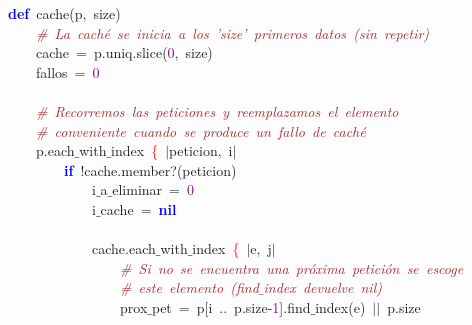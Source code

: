 \noindent
\mbox{}\textbf{\textcolor{Blue}{def}}\ cache\textcolor{BrickRed}{(}p\textcolor{BrickRed}{,}\ size\textcolor{BrickRed}{)} \\
\mbox{}\ \ \ \ \textit{\textcolor{Brown}{\#\ La\ caché\ se\ inicia\ a\ los\ 'size'\ primeros\ datos\ (sin\ repetir)}} \\
\mbox{}\ \ \ \ cache\ \textcolor{BrickRed}{=}\ p\textcolor{BrickRed}{.}uniq\textcolor{BrickRed}{.}slice\textcolor{BrickRed}{(}\textcolor{Purple}{0}\textcolor{BrickRed}{,}\ size\textcolor{BrickRed}{)} \\
\mbox{}\ \ \ \ fallos\ \textcolor{BrickRed}{=}\ \textcolor{Purple}{0} \\
\mbox{} \\
\mbox{}\ \ \ \ \textit{\textcolor{Brown}{\#\ Recorremos\ las\ peticiones\ y\ reemplazamos\ el\ elemento}} \\
\mbox{}\ \ \ \ \textit{\textcolor{Brown}{\#\ conveniente\ cuando\ se\ produce\ un\ fallo\ de\ caché}} \\
\mbox{}\ \ \ \ p\textcolor{BrickRed}{.}each$\_$with$\_$index\ \textcolor{Red}{\{}\ \textcolor{BrickRed}{$|$}peticion\textcolor{BrickRed}{,}\ i\textcolor{BrickRed}{$|$}\  \\
\mbox{}\ \ \ \ \ \ \ \ \textbf{\textcolor{Blue}{if}}\ \textcolor{BrickRed}{!}cache\textcolor{BrickRed}{.}member?\textcolor{BrickRed}{(}peticion\textcolor{BrickRed}{)} \\
\mbox{}\ \ \ \ \ \ \ \ \ \ \ \ i$\_$a$\_$eliminar\ \textcolor{BrickRed}{=}\ \textcolor{Purple}{0} \\
\mbox{}\ \ \ \ \ \ \ \ \ \ \ \ i$\_$cache\ \textcolor{BrickRed}{=}\ \textbf{\textcolor{Blue}{nil}} \\
\mbox{} \\
\mbox{}\ \ \ \ \ \ \ \ \ \ \ \ cache\textcolor{BrickRed}{.}each$\_$with$\_$index\ \textcolor{Red}{\{}\ \textcolor{BrickRed}{$|$}e\textcolor{BrickRed}{,}\ j\textcolor{BrickRed}{$|$} \\
\mbox{}\ \ \ \ \ \ \ \ \ \ \ \ \ \ \ \ \textit{\textcolor{Brown}{\#\ Si\ no\ se\ encuentra\ una\ próxima\ petición\ se\ escoge}} \\
\mbox{}\ \ \ \ \ \ \ \ \ \ \ \ \ \ \ \ \textit{\textcolor{Brown}{\#\ este\ elemento\ (find$\_$index\ devuelve\ nil)}} \\
\mbox{}\ \ \ \ \ \ \ \ \ \ \ \ \ \ \ \ prox$\_$pet\ \textcolor{BrickRed}{=}\ p\textcolor{BrickRed}{[}i\ \textcolor{BrickRed}{..}\ p\textcolor{BrickRed}{.}size\textcolor{BrickRed}{-}\textcolor{Purple}{1}\textcolor{BrickRed}{].}find$\_$index\textcolor{BrickRed}{(}e\textcolor{BrickRed}{)}\ \textcolor{BrickRed}{$|$$|$}\ p\textcolor{BrickRed}{.}size \\
